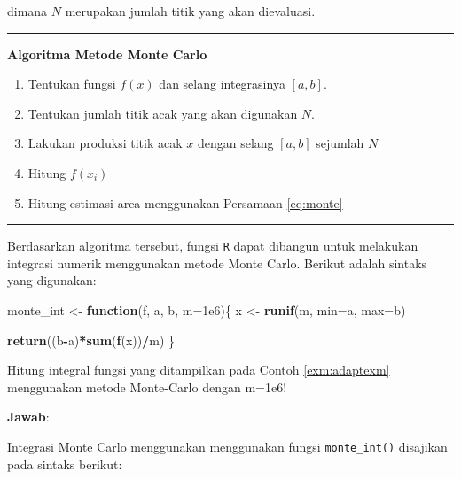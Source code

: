 \documentclass[]{book}
\newenvironment{Shaded}{\begin{snugshade}}{\end{snugshade}}
\newcommand{\ControlFlowTok}[1]{\textcolor[rgb]{0.13,0.29,0.53}{\textbf{#1}}}
\newcommand{\DataTypeTok}[1]{\textcolor[rgb]{0.13,0.29,0.53}{#1}}
\newcommand{\FloatTok}[1]{\textcolor[rgb]{0.00,0.00,0.81}{#1}}
\newcommand{\KeywordTok}[1]{\textcolor[rgb]{0.13,0.29,0.53}{\textbf{#1}}}
\newcommand{\NormalTok}[1]{#1}
\newcommand{\OperatorTok}[1]{\textcolor[rgb]{0.81,0.36,0.00}{\textbf{#1}}}
\newcommand{\StringTok}[1]{\textcolor[rgb]{0.31,0.60,0.02}{#1}}
\providecommand{\tightlist}{%
  \setlength{\itemsep}{0pt}\setlength{\parskip}{0pt}}
\theoremstyle{definition}
\theoremstyle{definition}
\theoremstyle{definition}
\theoremstyle{remark}
\let\BeginKnitrBlock\begin \let\EndKnitrBlock\end
\begin{document}
dimana \(N\) merupakan jumlah titik yang akan dievaluasi.

\begin{center}\rule{0.5\linewidth}{\linethickness}\end{center}

\textbf{Algoritma Metode Monte Carlo}

\begin{enumerate}
\def\labelenumi{\arabic{enumi}.}
\tightlist
\item
  Tentukan fungsi \(f\left(x\right)\) dan selang integrasinya \(\left[a,b\right]\).
\item
  Tentukan jumlah titik acak yang akan digunakan \(N\).
\item
  Lakukan produksi titik acak \(x\) dengan selang \(\left[a,b\right]\) sejumlah \(N\)
\item
  Hitung \(f\left(x_i\right)\)
\item
  Hitung estimasi area menggunakan Persamaan \eqref{eq:monte}
\end{enumerate}

\begin{center}\rule{0.5\linewidth}{\linethickness}\end{center}

Berdasarkan algoritma tersebut, fungsi \texttt{R} dapat dibangun untuk melakukan integrasi numerik menggunakan metode Monte Carlo. Berikut adalah sintaks yang digunakan:

\begin{Shaded}
\begin{Highlighting}[]
\NormalTok{monte_int <-}\StringTok{ }\ControlFlowTok{function}\NormalTok{(f, a, b, }\DataTypeTok{m=}\FloatTok{1e6}\NormalTok{)\{}
\NormalTok{  x <-}\StringTok{ }\KeywordTok{runif}\NormalTok{(m, }\DataTypeTok{min=}\NormalTok{a, }\DataTypeTok{max=}\NormalTok{b)}
  
  \KeywordTok{return}\NormalTok{((b}\OperatorTok{-}\NormalTok{a)}\OperatorTok{*}\KeywordTok{sum}\NormalTok{(}\KeywordTok{f}\NormalTok{(x))}\OperatorTok{/}\NormalTok{m)}
\NormalTok{\}}
\end{Highlighting}
\end{Shaded}

\BeginKnitrBlock{example}
\protect\hypertarget{exm:monteexm}{}{\label{exm:monteexm} }Hitung integral fungsi yang ditampilkan pada Contoh \ref{exm:adaptexm} menggunakan metode Monte-Carlo dengan m=1e6!
\EndKnitrBlock{example}

\textbf{Jawab}:

Integrasi Monte Carlo menggunakan menggunakan fungsi \texttt{monte\_int()} disajikan pada sintaks berikut:
\end{document}

